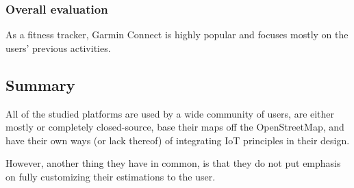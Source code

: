 \subsubsection*{Overall evaluation}
As a fitness tracker, Garmin Connect is highly popular and focuses mostly on the users' previous activities.

\subsection{Summary}
All of the studied platforms are used by a wide community of users, are either mostly or completely closed-source, base their maps off the OpenStreetMap, and have their own ways (or lack thereof) of integrating IoT principles in their design.

However, another thing they have in common, is that they do not put emphasis on fully customizing their estimations to the user.